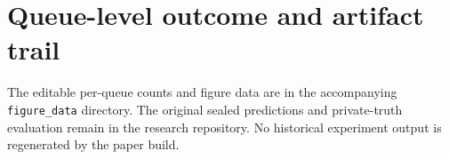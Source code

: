 \section{Queue-level outcome and artifact trail}
The editable per-queue counts and figure data are in the accompanying \texttt{figure\_data} directory. The original sealed predictions and private-truth evaluation remain in the research repository. No historical experiment output is regenerated by the paper build.
